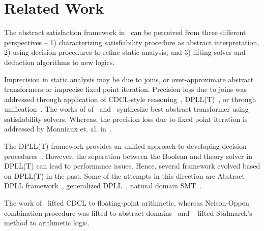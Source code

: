 \section{Related Work}
%
The abstract satisfaction framework in~\cite{leo-thesis} can be perceived from
three different perspectives -- 1) characterizing satisfiability procedure as 
abstract interpretation, 2) using decision procedures to refine static analysis, 
and 3) lifting solver and deduction algorithms to new logics.   

Imprecision in static analysis may be due to joins, or over-approximate abstract
transformers or imprecise fixed point iteration. Precision loss due to joins was 
addressed through application of CDCL-style reasoning~\cite{tacas12}, 
DPLL(T)~\cite{SMPP}, or through unification~\cite{cade07}.  The works of   
of~\cite{vmcai04} and~\cite{cav12} synthesize best abstract transformer using
satisfiability solvers. Whereas, the precision loss due to fixed point iteration
is addressed by Monniaux et. al. in~\cite{sas11}.

The DPLL(T) framework provides an unified approach to developing decision 
procedures~\cite{dpllt}.  However, the seperation between the Boolean and 
theory solver in DPLL(T) can lead to performance issues.  Hence, several 
framework evolved based on DPLL(T) in the past.  Some of the attempts in 
this direction are Abstract DPLL framework~\cite{adpll}, generalized 
DPLL~\cite{dpll}, natural domain SMT~\cite{ndsmt}.

The work of~\cite{DBLP:journals/fmsd/BrainDGHK14} lifted CDCL to floating-point 
arithmetic, whereas Nelson-Oppen combination procedure was lifted to abstract
domains~\cite{cav12} and ~\cite{pldi06} lifted St$\mathring{\text{a}}$lmarck's 
method to arithmetic logic. 
